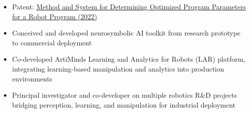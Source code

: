 
\begin{itemize}
  \item Patent: \href{http://depatisnet.dpma.de/DepatisNet/depatisnet?action=bibdat&docid=WO002022022784A1}{Method and System for Determining Optimized Program Parameters for a Robot Program (2022)}
  \item Conceived and developed neurosymbolic AI toolkit from research prototype to commercial deployment
  \item Co-developed ArtiMinds Learning and Analytics for Robots (LAR) platform, integrating learning-based manipulation and analytics into production environments
  \item Principal investigator and co-developer on multiple robotics R\&D projects bridging perception, learning, and manipulation for industrial deployment
\end{itemize}